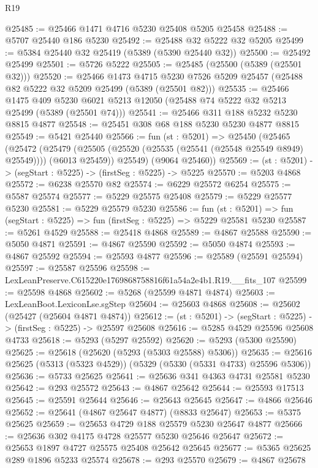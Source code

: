 \begin{lexlean}{R19}
\begin{coremodule}
@25485 := @25466 @1471 @4716 @5230 @25408 @5205 @25458
@25488 := @5707 @25440 @186 @5230
@25492 := @25488 @32 @5222 @32 @5205
@25499 := @5384 @25440 @32 @25419 (@5389 (@5390 @25440 @32))
@25500 := @25492 @25499
@25501 := @5726 @5222
@25505 := @25485 (@25500 (@5389 (@25501 @32)))
@25520 := @25466
    @1473
    @4715
    @5230
    @7526
    @5209
    @25457
    (@25488 @82 @5222 @32 @5209 @25499 (@5389 (@25501 @82)))
@25535 := @25466
    @1475
    @409
    @5230
    @6021
    @5213
    @12050
    (@25488 @74 @5222 @32 @5213 @25499 (@5389 (@25501 @74)))
@25541 := @25466 @311 @188 @5232 @5230 @8815 @4877
@25548 := @25451 @308 @68 @188 @5230 @5230 @4877 @8815
@25549 := @5421 @25440
@25566 := fun (st : @5201) =>
  @25450
    (@25465
      (@25472
        (@25479 (@25505 (@25520 (@25535 (@25541 (@25548 @25549 @8949) @25549)))) (@6013 @25459))
        @25549)
      (@9064 @25460))
@25569 := (st : @5201) -> (segStart : @5225) -> (firstSeg : @5225) -> @5225
@25570 := @5203 @4868
@25572 := @6238 @25570 @82
@25574 := @6229 @25572 @6254
@25575 := @5587 @25574
@25577 := @5229 @25575 @25408
@25579 := @5229 @25577 @5230
@25581 := @5229 @25579 @5230
@25586 := fun (st : @5201) => fun (segStart : @5225) => fun (firstSeg : @5225) => @5229 @25581 @5230
@25587 := @5261 @4529
@25588 := @25418 @4868
@25589 := @4867 @25588
@25590 := @5050 @4871
@25591 := @4867 @25590
@25592 := @5050 @4874
@25593 := @4867 @25592
@25594 := @25593 @4877
@25596 := @25589 (@25591 @25594)
@25597 := @25587 @25596
@25598 := LexLeanPreserve.C615220e1769868758816f61a54a2e4b1.R19.__fits_107
@25599 := @25598 @4868
@25602 := @5268 (@25599 @4871 @4874)
@25603 := LexLeanBoot.LexiconLse.sgStep
@25604 := @25603 @4868
@25608 := @25602 (@25427 (@25604 @4871 @4874))
@25612 := (st : @5201) -> (segStart : @5225) -> (firstSeg : @5225) -> @25597 @25608
@25616 := @5285 @4529 @25596 @25608 @4733
@25618 := @5293 (@5297 @25592)
@25620 := @5293 (@5300 @25590)
@25625 := @25618 (@25620 (@5293 (@5303 @25588) @5306))
@25635 := @25616 @25625 (@5313 (@5323 @4529)) (@5329 (@5330 (@5331 @4733) @25596 @5306))
@25636 := @5733 @25625
@25641 := @25636 @341 @4363 @4731 @25581 @5230
@25642 := @293 @25572
@25643 := @4867 @25642
@25644 := @25593 @17513
@25645 := @25591 @25644
@25646 := @25643 @25645
@25647 := @4866 @25646
@25652 := @25641 (@4867 @25647 @4877) (@8833 @25647)
@25653 := @5375 @25625
@25659 := @25653 @4729 @188 @25579 @5230 @25647 @4877
@25666 := @25636 @302 @4175 @4728 @25577 @5230 @25646 @25647
@25672 := @25653 @1897 @4727 @25575 @25408 @25642 @25645
@25677 := @5365 @25625 @289 @1896 @5233 @25574
@25678 := @293 @25570
@25679 := @4867 @25678

\end{coremodule}
\end{lexlean}
